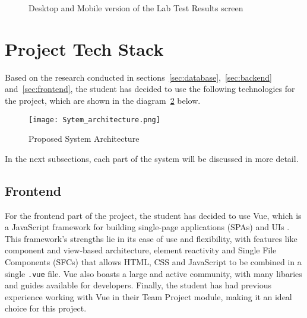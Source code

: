 \begin{figure}[ht]
    \centering
    \begin{minipage}[c]{0.70\textwidth}
    \end{minipage}
    \hspace{0.05\textwidth}
    \begin{minipage}[c]{0.20\textwidth}
    \end{minipage}
    \caption{Desktop and Mobile version of the Lab Test Results screen}\label{fig:lab}
\end{figure}

\section{Project Tech Stack}\label{sec:techstack}

Based on the research conducted in sections~\ref{sec:database},~\ref{sec:backend} and~\ref{sec:frontend}, the student has decided to use the following technologies for the project, which are shown in the diagram~\ref{fig:architecture} below.

\begin{figure}[htbp]
    \centering
    \texttt{[image: Sytem\_architecture.png]}
    \caption{Proposed System Architecture}\label{fig:architecture}
\end{figure}

In the next subsections, each part of the system will be discussed in more detail.

\subsection{Frontend}

For the frontend part of the project, the student has decided to use Vue, which is a JavaScript framework for building single-page applications (SPAs) and UIs \parencite{vue}. This framework's strengths lie in its ease of use and flexibility, with features like component and view-based architecture, element reactivity and Single File Components (SFCs) that allows HTML, CSS and JavaScript to be combined in a single \lstinline{.vue} file. Vue also boasts a large and active community, with many libaries and guides available for developers. Finally, the student has had previous experience working with Vue in their Team Project module, making it an ideal choice for this project.

